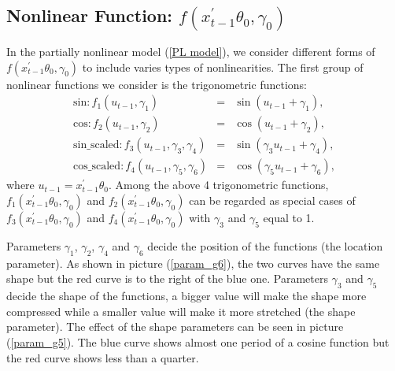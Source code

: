 \documentclass[a4paper,12pt,times,numbered,print,index]{report}
\numberwithin{equation}{section}
\begin{document}
\subsection{Nonlinear Function: $f\left(x_{t-1}^{\prime }\theta _{0},\gamma _{0}\right)$}
In the partially nonlinear model (\ref{PL model}), we consider different forms of $f\left(x_{t-1}^{\prime }\theta _{0},\gamma _{0}\right)$ to include varies types of nonlinearities. The first group of nonlinear functions we consider is the trigonometric functions: 
\begin{eqnarray*}
	\text{sin}: f_{1}\left( u_{t-1},\gamma _{1}\right) &=&\sin \left( u_{t-1}+\gamma_{1}\right),  \\
	\text{cos}: f_{2}\left( u_{t-1},\gamma _{2}\right) &=&\cos \left( u_{t-1}+\gamma_{2}\right), \\
	\text{sin\_scaled}: f_{3}\left( u_{t-1},\gamma_{3}, \gamma_{4}\right) &=&\sin \left( \gamma_{3}u_{t-1}+\gamma_{4}\right),  \\
	\text{cos\_scaled}: f_{4}\left( u_{t-1},\gamma_{5}, \gamma_{6}\right) &=&\cos \left( \gamma_{5}u_{t-1}+\gamma_{6}\right),
\end{eqnarray*} 
where $u_{t-1} =  x_{t-1}^{\prime }\theta _{0}$.
Among the above 4 trigonometric functions, $f_{1} \left(x_{t-1}^{\prime }\theta _{0},\gamma _{0}\right)$ and $f_{2} \left(x_{t-1}^{\prime }\theta _{0},\gamma _{0}\right)$ can be regarded as special cases of $f_{3}\left(x_{t-1}^{\prime }\theta _{0},\gamma _{0}\right)$ and $f_{4} \left(x_{t-1}^{\prime }\theta _{0},\gamma _{0}\right)$ with $\gamma_{3}$ and $\gamma_{5}$ equal to 1. 

Parameters $\gamma_{1}$, $\gamma_{2}$, $\gamma_{4}$ and $\gamma_{6}$ decide the position of the functions (the location parameter). As shown in picture (\ref{param_g6}), the two curves have the same shape but the red curve is to the right of the blue one. Parameters $\gamma_{3}$ and $\gamma_{5}$ decide the shape of the functions, a bigger value will make the shape more compressed while a smaller value will make it more stretched (the shape parameter). The effect of the shape parameters can be seen in picture (\ref{param_g5}). The blue curve shows almost one period of a cosine function but the red curve shows less than a quarter.
\end{document}
